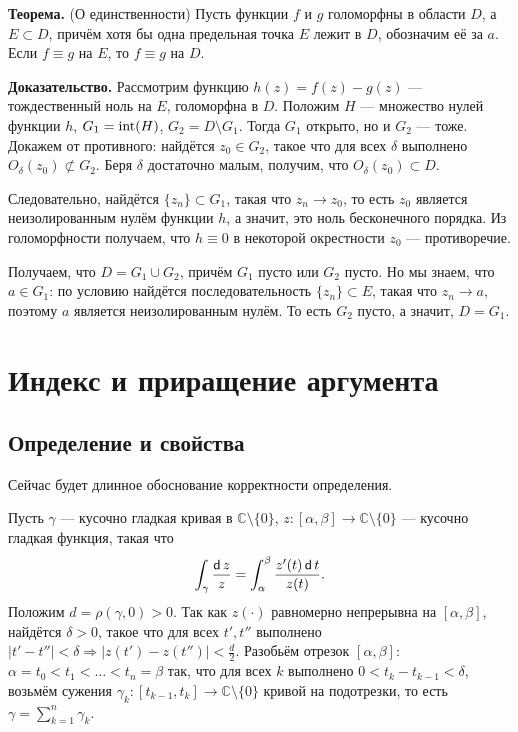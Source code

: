 \QED

\textbf{Теорема.} (О единственности) Пусть функции $f$ и $g$ голоморфны в области $D$, а $E \subset D$, причём хотя бы одна предельная точка $E$ лежит в $D$, обозначим её за $a$.
Если $f \equiv g$ на $E$, то $f \equiv g$ на $D$.

\textbf{Доказательство.} Рассмотрим функцию $h(z) = f(z) - g(z)$ --- тождественный ноль на $E$, голоморфна в $D$.
Положим $H$ --- множество нулей функции $h$, $G_1 = \operatorname{int}(H)$, $G_2 = D \setminus G_1$.
Тогда $G_1$ открыто, но и $G_2$ --- тоже. Докажем от противного: найдётся $z_0 \in G_2$, такое что для всех $\delta$ выполнено $O_\delta(z_0) \not\subset G_2$.
Беря $\delta$ достаточно малым, получим, что $O_\delta(z_0) \subset D$.

Следовательно, найдётся $\{z_n\} \subset G_1$, такая что $z_n \to z_0$, то есть $z_0$ является неизолированным нулём функции $h$, а значит, это ноль бесконечного порядка.
Из голоморфности получаем, что $h \equiv 0$ в некоторой окрестности $z_0$ --- противоречие.

Получаем, что $D = G_1 \cup G_2$, причём $G_1$ пусто или $G_2$ пусто.
Но мы знаем, что $a \in G_1$: по условию найдётся последовательность $\{z_n\} \subset E$, такая что $z_n \to a$, поэтому $a$ является неизолированным нулём.
То есть $G_2$ пусто, а значит, $D = G_1$.

\QED

\section{Индекс и приращение аргумента}
\subsection{Определение и свойства}
Сейчас будет длинное обоснование корректности определения.

Пусть $\gamma$ --- кусочно гладкая кривая в $\mathbb C \setminus \{0\}$, $z: [\alpha, \beta] \to \mathbb C \setminus \{0\}$ --- кусочно гладкая функция, такая что
\[
    \int_\gamma \frac{\operatorname{\mathsf d} z}{z} = \int_\alpha^\beta \frac{z'(t) \operatorname{\mathsf d} t}{z(t)}.
\]
Положим $d = \rho(\gamma, 0) > 0$.
Так как $z(\cdot)$ равномерно непрерывна на $[\alpha, \beta]$, найдётся $\delta > 0$, такое что для всех $t', t''$ выполнено $|t' - t''| < \delta \Rightarrow |z(t') - z(t'')| < \frac{d}{2}$.
Разобьём отрезок $[\alpha, \beta]$: $\alpha = t_0 < t_1 < \dots < t_n = \beta$ так, что для всех $k$ выполнено $0 < t_k - t_{k-1} < \delta$, возьмём сужения $\gamma_k: [t_{k-1}, t_k] \to \mathbb C \setminus \{0\}$ кривой на подотрезки, то есть $\gamma = \sum_{k=1}^{n} \gamma_k$.

